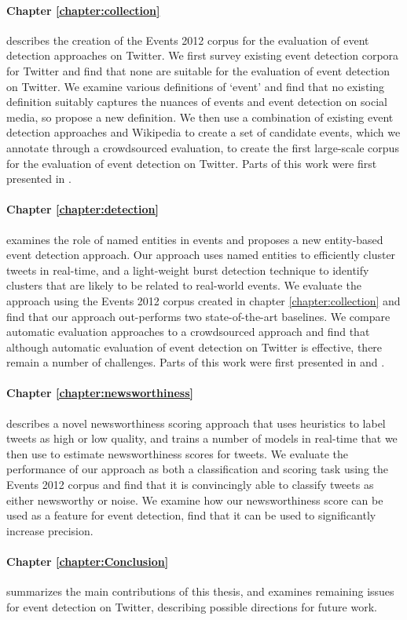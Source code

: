 \vspace{-0.5cm}
\paragraph{Chapter \ref{chapter:collection}} describes the creation of the Events 2012 corpus for the evaluation of event detection approaches on Twitter. We first survey existing event detection corpora for Twitter and find that none are suitable for the evaluation of event detection on Twitter.
We examine various definitions of `event' and find that no existing definition suitably captures the nuances of events and event detection on social media, so propose a new definition.
We then use a combination of existing event detection approaches and Wikipedia to create a set of candidate events, which we annotate through a crowdsourced evaluation, to create the first large-scale corpus for the evaluation of event detection on Twitter. Parts of this work were first presented in \cite{McMinn2013}.

\vspace{-0.5cm}
\paragraph{Chapter \ref{chapter:detection}} examines the role of named entities in events and proposes a new entity-based event detection approach.
Our approach uses named entities to efficiently cluster tweets in real-time, and a light-weight burst detection technique to identify clusters that are likely to be related to real-world events.
We evaluate the approach using the Events 2012 corpus created in chapter \ref{chapter:collection} and find that our approach out-performs two state-of-the-art baselines.
We compare automatic evaluation approaches to a crowdsourced approach and find that although automatic evaluation of event detection on Twitter is effective, there remain a number of challenges.
Parts of this work were first presented in \cite{McMinn14} and \cite{McMinn15}.

\vspace{-0.5cm}
\paragraph{Chapter \ref{chapter:newsworthiness}} describes a novel newsworthiness scoring approach that uses heuristics to label tweets as high or low quality, and trains a number of models in real-time that we then use to estimate newsworthiness scores for tweets.
We evaluate the performance of our approach as both a classification and scoring task using the Events 2012 corpus and find that it is convincingly able to classify tweets as either newsworthy or noise.
We examine how our newsworthiness score can be used as a feature for event detection, find that it can be used to significantly increase precision.

\vspace{-0.5cm}
\paragraph{Chapter \ref{chapter:Conclusion}} summarizes the main contributions of this thesis, and examines remaining issues for event detection on Twitter, describing possible directions for future work.


\newpage
